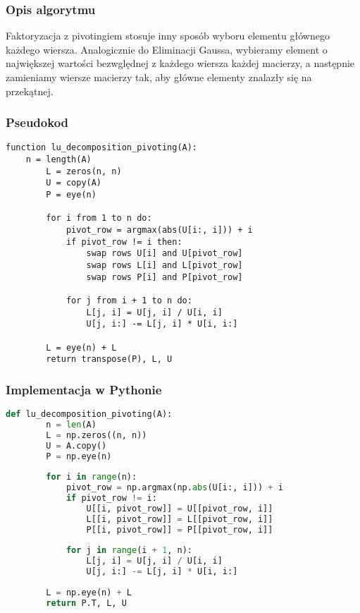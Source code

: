 \documentclass[12pt,a4paper,table]{article}
\begin{document}
    \subsubsection{Opis algorytmu}
    Faktoryzacja z pivotingiem stosuje inny sposób wyboru elementu głównego każdego wiersza. Analogicznie do Eliminacji Gaussa, wybieramy element o największej wartości bezwględnej z każdego wiersza każdej macierzy, a następnie zamieniamy wiersze macierzy tak, aby główne elementy znalazły się na przekątnej.  
    \subsubsection{Pseudokod}
    \begin{lstlisting}[]
    function lu_decomposition_pivoting(A):
    n = length(A)
        L = zeros(n, n)
        U = copy(A)
        P = eye(n)
    
        for i from 1 to n do:
            pivot_row = argmax(abs(U[i:, i])) + i
            if pivot_row != i then:
                swap rows U[i] and U[pivot_row]
                swap rows L[i] and L[pivot_row]
                swap rows P[i] and P[pivot_row]
    
            for j from i + 1 to n do:
                L[j, i] = U[j, i] / U[i, i]
                U[j, i:] -= L[j, i] * U[i, i:]
    
        L = eye(n) + L
        return transpose(P), L, U

    \end{lstlisting}
    \subsubsection{Implementacja w Pythonie}
    \begin{lstlisting}[language=Python]
    def lu_decomposition_pivoting(A):
        n = len(A)
        L = np.zeros((n, n))
        U = A.copy()
        P = np.eye(n)
    
        for i in range(n):
            pivot_row = np.argmax(np.abs(U[i:, i])) + i
            if pivot_row != i:
                U[[i, pivot_row]] = U[[pivot_row, i]]
                L[[i, pivot_row]] = L[[pivot_row, i]]
                P[[i, pivot_row]] = P[[pivot_row, i]]
    
            for j in range(i + 1, n):
                L[j, i] = U[j, i] / U[i, i]
                U[j, i:] -= L[j, i] * U[i, i:]
    
        L = np.eye(n) + L
        return P.T, L, U
    \end{lstlisting}
\end{document}
